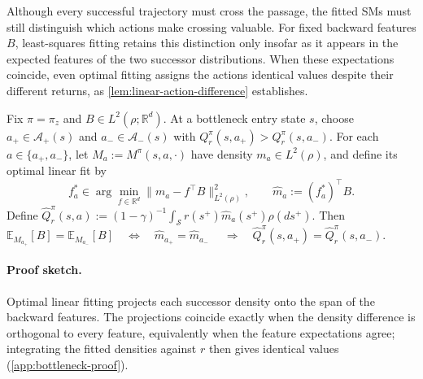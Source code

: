 Although every successful trajectory must cross the passage, the fitted SMs must still distinguish which actions make crossing valuable.
For fixed backward features $B$, least-squares fitting retains this distinction only insofar as it appears in the expected features of the two successor distributions. When these expectations coincide, even optimal fitting assigns the actions identical values despite their different returns, as \cref{lem:linear-action-difference} establishes.


\begin{lemma}
\label{lem:linear-action-difference}
Fix $\pi=\pi_z$ and $B\in L^2(\rho;\mathbb R^d)$.
At a bottleneck entry state $s$, choose $a_+\in\mathcal A_+(s)$ and $a_-\in\mathcal A_-(s)$ with $Q_r^\pi(s,a_+)>Q_r^\pi(s,a_-)$.
For each $a\in\{a_+,a_-\}$, let $M_a:=M^\pi(s,a,\cdot)$ have density $m_a\in L^2(\rho)$, and define its optimal linear fit by
\[
    f_a^*\in\arg\min_{f\in\mathbb R^d} \|m_a-f^\top B\|_{L^2(\rho)}^2, \qquad \widehat m_a:=(f_a^*)^\top B.
\]
Define $\widehat Q_r^\pi(s,a):=(1-\gamma)^{-1} \int_{\mathcal S}r(s^+)\widehat m_a(s^+)\rho(ds^+)$. Then
\(
    \mathbb E_{M_{a_+}}[B]=\mathbb E_{M_{a_-}}[B] \quad\Longleftrightarrow\quad \widehat m_{a_+}=\widehat m_{a_-}\;
    \quad\Longrightarrow\quad
    \widehat Q_r^\pi(s,a_+)=\widehat Q_r^\pi(s,a_-).
\)
\end{lemma}

\paragraph{Proof sketch.} Optimal linear fitting projects each successor density onto the span of the backward features. The projections coincide exactly when the density difference
is orthogonal to every feature, equivalently when the feature expectations agree; integrating the fitted densities against $r$ then gives identical values (\cref{app:bottleneck-proof}).

